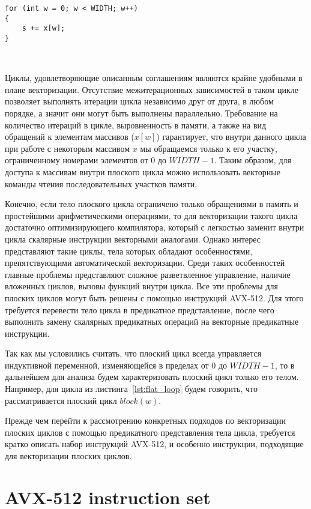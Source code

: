 \documentclass[
11pt,%
tightenlines,%
twoside,%
onecolumn,%
nofloats,%
nobibnotes,%
nofootinbib,%
superscriptaddress,%
noshowpacs,%
centertags]%
{revtex4}
\begin{document}
\begin{lstlisting}[caption={Простейший пример неплоского цикла.},label={lst:not_flat_loop}]
for (int w = 0; w < WIDTH; w++)
{
    s += x[w];
}
\end{lstlisting}

\

Циклы, удовлетворяющие описанным соглашениям являются крайне удобными в плане векторизации.
Отсутствие межитерационных зависимостей в таком цикле позволяет выполнять итерации цикла независимо друг от друга, в любом порядке, а значит они могут быть выполнены параллельно.
Требование на количество итераций в цикле, выровненность в памяти, а также на вид обращений к элементам массивов ($x[w]$) гарантирует, что внутри данного цикла при работе с некоторым массивом $x$ мы обращаемся только к его участку, ограниченному номерами элементов от $0$ до $WIDTH - 1$.
Таким образом, для доступа к массивам внутри плоского цикла можно использовать векторные команды чтения последовательных участков памяти.

Конечно, если тело плоского цикла ограничено только обращениями в память и простейшими арифметическими операциями, то для векторизации такого цикла достаточно оптимизирующего компилятора, который с легкостью заменит внутри цикла скалярные инструкции векторными аналогами.
Однако интерес представляют такие циклы, тела которых обладают особенностями, препятствующими автоматической векторизации.
Среди таких особенностей главные проблемы представляют сложное разветвленное управление, наличие вложенных циклов, вызовы функций внутри цикла.
Все эти проблемы для плоских циклов могут быть решены с помощью инструкций AVX-512.
Для этого требуется перевести тело цикла в предикатное представление, после чего выполнить замену скалярных предикатных операций на векторные предикатные инструкции.

Так как мы условились считать, что плоский цикл всегда управляется индуктивной переменной, изменяющейся в пределах от $0$ до $WIDTH - 1$, то в дальнейшем для анализа будем характеризовать плоский цикл только его телом.
Например, для цикла из листинга~\ref{lst:flat_loop} будем говорить, что рассматривается плоский цикл $block(w)$.

Прежде чем перейти к рассмотрению конкретных подходов по векторизации плоских циклов с помощью предикатного представления тела цикла, требуется кратко описать набор инструкций AVX-512, и особенно инструкции, подходящие для векторизации плоских циклов.

\section{AVX-512 instruction set}
\end{document}
